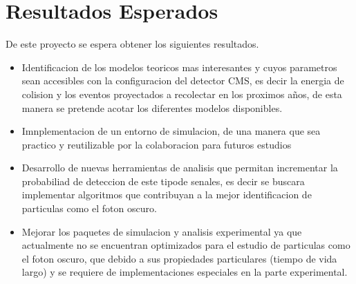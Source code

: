 \chapter{Resultados Esperados} 

De este proyecto se espera obtener los siguientes resultados.

\begin{itemize}
\item Identificacion de los modelos teoricos mas interesantes y cuyos parametros sean accesibles con la configuracion del detector CMS, es decir la energia de colision y los eventos proyectados a recolectar en los proximos a\~nos, de esta manera se pretende acotar los diferentes modelos disponibles.
\item Imnplementacion de un entorno de simulacion, de una manera que sea practico y reutilizable por la colaboracion para futuros estudios
\item Desarrollo de nuevas herramientas de analisis que permitan incrementar la probabiliad de deteccion de este tipode senales, es decir se buscara implementar algoritmos que contribuyan a la mejor identificacion de particulas como el foton oscuro.
\item Mejorar los paquetes de simulacion y analisis experimental ya que actualmente no se encuentran optimizados para el estudio de particulas como el foton oscuro, que debido a sus propiedades particulares (tiempo de vida largo) y se requiere de implementaciones especiales en la parte experimental.
\end{itemize}




